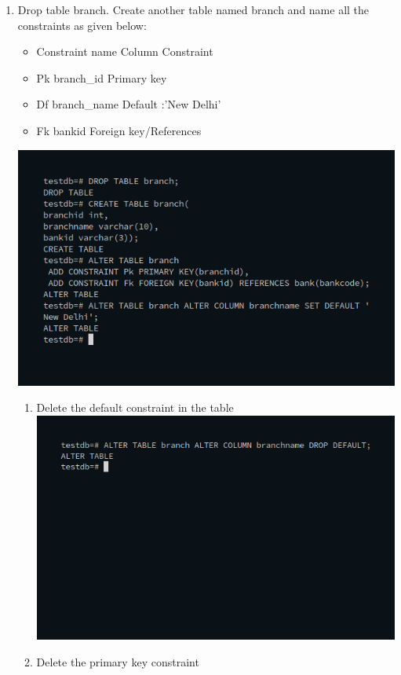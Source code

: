 \documentclass[10pt,a4paper,titlepage]{report}
\begin{document}
{\begin{enumerate}
\item Drop table branch. Create another table named branch and name all the constraints as given below:
	\begin{itemize}
		\item Constraint name Column Constraint
		\item Pk branch\_id Primary key
		\item Df branch\_name Default :’New Delhi’
		\item Fk bankid Foreign key/References
	\end{itemize}
	\includegraphics[width=\linewidth]{../Images/Constraints/16.png}\newline
	\begin{enumerate}
		\item Delete the default constraint in the table\newline
		\includegraphics[width=\linewidth]{../Images/Constraints/17.png}\newline
		\item Delete the primary key constraint\newline

\end{enumerate}
\end{enumerate}}
\end{document}
